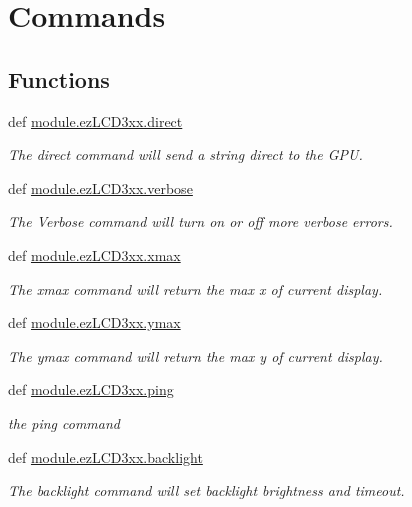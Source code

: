 \hypertarget{group___general}{\section{Commands}
\label{group___general}
}
\subsection*{Functions}
\begin{DoxyCompactItemize}
\item 
def \hyperlink{group___general_gaae4c9fde1cb31e9eeb914f81698c6c92}{module.\-ez\-L\-C\-D3xx.\-direct}
\begin{DoxyCompactList}\small\item\em The direct command will send a string direct to the G\-P\-U. \end{DoxyCompactList}\item 
def \hyperlink{group___general_ga350c2e1be0d3d074d79d7a7278c44a22}{module.\-ez\-L\-C\-D3xx.\-verbose}
\begin{DoxyCompactList}\small\item\em The Verbose command will turn on or off more verbose errors. \end{DoxyCompactList}\item 
def \hyperlink{group___general_ga594f839f4d44b15ece850c795ec8e7ba}{module.\-ez\-L\-C\-D3xx.\-xmax}
\begin{DoxyCompactList}\small\item\em The xmax command will return the max x of current display. \end{DoxyCompactList}\item 
def \hyperlink{group___general_gae8e395513eeb5519612f3e988a059106}{module.\-ez\-L\-C\-D3xx.\-ymax}
\begin{DoxyCompactList}\small\item\em The ymax command will return the max y of current display. \end{DoxyCompactList}\item 
def \hyperlink{group___general_ga123be6aba6fc316922b71e3fe1bc7aaf}{module.\-ez\-L\-C\-D3xx.\-ping}
\begin{DoxyCompactList}\small\item\em the ping command \end{DoxyCompactList}\item 
def \hyperlink{group___general_ga8b73d9d966ac29c172e81aac05bf9bf9}{module.\-ez\-L\-C\-D3xx.\-backlight}
\begin{DoxyCompactList}\small\item\em The backlight command will set backlight brightness and timeout. \end{DoxyCompactList}\item 

\end{DoxyCompactItemize}
